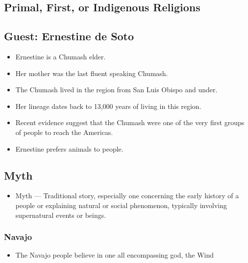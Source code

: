 \documentclass{article}
\begin{document}
\begin{spacing}{1.2}
        \section{Primal, First, or Indigenous Religions}
        \subsection{Guest: Ernestine de Soto}
        \begin{itemize}
            \item Ernestine is a Chumash elder.
            \item Her mother was the last fluent speaking Chumash.
            \item The Chumash lived in the region from San Luis Obispo and
                under.
            \item Her lineage dates back to 13,000 years of living in this
                region.
            \item Recent evidence suggest that the Chumash were one of the very
                first groups of people to reach the Americas.
            \item Ernestine prefers animals to people.
        \end{itemize}
        \subsection{Myth}
    \begin{itemize}
        \item Myth --- Traditional story, especially one concerning the early
            history of a people or explaining natural or social phenomenon,
            typically involving supernatural events or beings.
    \end{itemize}
    \subsubsection{Navajo}
    \begin{itemize}
        \item The Navajo people believe in one all encompassing god, the Wind
    \end{itemize}

\end{spacing}
\end{document}

